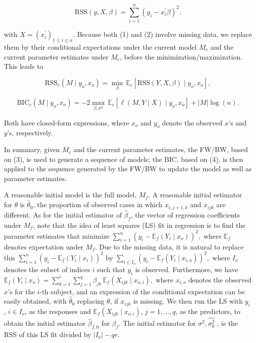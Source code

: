 \documentclass[
  12pt,
]{article}
\begin{document}
\begin{equation}
\text{RSS}(y, X, \beta)
= \sum_{i=1}^{n} (y_i - x_i^\prime \beta)^2. \tag{2}
\end{equation}

with \(X = (x^\prime_i)_{1 \le i \le n}\). Because both (1) and (2)
involve missing data, we replace them by their conditional expectations
under the current model \(M_c\) and the current parameter estimates
under \(M_c\), before the minimization/maximization. This leads to

\begin{equation}
\text{RSS}_c(M \mid y_o, x_o)
= \min_{\beta} \, \mathbb{E}_c \!\left[ \text{RSS}(Y, X, \beta) \mid y_o, x_o \right], \tag{3}
\end{equation}

\begin{equation}
\text{BIC}_c(M \mid y_o, x_o)
= -2 \max_{\beta, \sigma^2} \, \mathbb{E}_c \!\left[ \ell(M, Y \mid X) \mid y_o, x_o \right]
+ |M| \log(n). \tag{4}
\end{equation}

Both have closed-form expressions, where \(x_o\) and \(y_o\)
denote the observed \(x\)'s and \(y\)'s, respectively.

In summary, given \(M_c\) and the current parameter estimates, the
FW/BW, based on (3), is used to generate a sequence of models; the BIC,
based on (4), is then applied to the sequence generated by the FW/BW to
update the model as well as parameter estimates.

A reasonable initial model is the full model, \(M_f\). A reasonable
initial estimator for \(\theta\) is \(\hat{\theta}_0\), the proportion
of observed cases in which \(x_{i,j+1,k}\) and \(x_{ijk}\) are
different. As for the initial estimator of \(\hat{\beta}_f\), the vector
of regression coefficients under \(M_f\), note that the idea of least
squares (LS) fit in regression is to find the parameter estimates that
minimize \(\sum_{i=1}^{n} (y_i - \mathbb{E}_f(Y_i \mid x_o))^2,\) where
\(\mathbb{E}_f\) denotes expectation under \(M_f\). Due to the missing
data, it is natural to replace this
\(\sum_{i=1}^{n} (y_i - \mathbb{E}_f(Y_i \mid x_i))^2\) by
\(\sum_{i \in I_o} (y_i - \mathbb{E}_f(Y_i \mid x_{i,o}))^2,\) where
\(I_o\) denotes the subset of indices \(i\) such that \(y_i\) is
observed. Furthermore, we have
\(\mathbb{E}_f(Y_i \mid x_{o})= \sum_{k=1}^{r} \sum_{j=1}^{q} \beta_{jk} \, \mathbb{E}_f(X_{ijk} \mid x_{o,i}),\)
where \(x_{i,o}\) denotes the observed \(x\)'s for the \(i\)-th subject,
and an expression of the conditional expectation can be easily obtained,
with \(\hat{\theta}_0\) replacing \(\theta\), if \(x_{ijk}\) is missing.
We then run the LS with \(y_i\), \(i \in I_o\), as the responses and
\(\mathbb{E}_f(X_{ijk} \mid x_{o,i})\), \(j = 1, \ldots, q\), as the
predictors, to obtain the initial estimator \(\hat{\beta}_{f,0}\) for
\(\beta_f\). The initial estimator for \(\sigma^2 , \hat{\sigma^2_0}\) ,
is the RSS of this LS fit divided by \(|I_o| - qr\).
\end{document}
